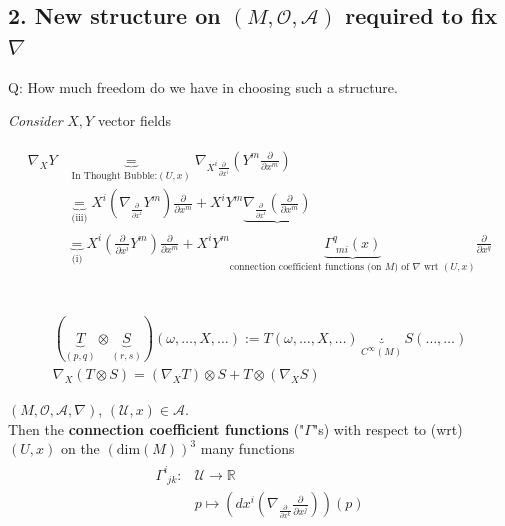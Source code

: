 			








			





	
	\subsection*{2. New structure on $(M,\mathcal{O},\mathcal{A})$ required to fix $\nabla$}

Q: How much freedom do we have in choosing such a structure.

\emph{Consider} $X,Y$ vector fields

\[
\begin{gathered}
\begin{aligned} 
\nabla_XY & \underbrace{=}_{\text{In Thought Bubble:} (U,x)  } \nabla_{X^i \frac{\partial}{\partial x^i} } \left( Y^m \frac{\partial}{ \partial x^m} \right) \\
& \underbrace{=}_{\text{(iii)}} X^i \left( \nabla_{\frac{\partial}{\partial x^i} } Y^m \right) \frac{\partial}{\partial x^m} + X^i Y^m \underbrace{ \nabla_{\frac{\partial}{\partial x^i} } \left( \frac{\partial }{ \partial x^m} \right) }_{} \\
& \underbrace{=}_{\text{(i)}} X^i \left( \frac{\partial}{\partial x^i} Y^m \right) \frac{\partial}{ \partial x^m} + X^i Y^m \underbrace{\Gamma^q_{\,\, mi}(x)}_{\text{connection coefficient functions (on $M$) of $\nabla$ wrt $(U,x)$}} \frac{\partial}{\partial x^q}
\end{aligned} 
\end{gathered}
\]	

\quad \\

\[
\begin{gathered}
(\underbrace{T}_{(p,q)}\otimes \underbrace{S}_{(r,s)})(\omega, \dots, X, \dots) := T(\omega, \dots, X, \dots) \underbrace{\cdot}_{C^{\infty}(M)} S(\dots, \dots) \\
\nabla_X (T \otimes S) = (\nabla_X T) \otimes S + T\otimes (\nabla_X S)
\end{gathered}
\]

\begin{definition} $(M, \mathcal{O}, \mathcal{A}, \nabla)$, $(\mathcal{U}, x) \in \mathcal{A}$. \\	
	Then the \textbf{connection coefficient functions} ("$\Gamma$"s) with respect to (wrt) $(U,x)$ on the $(\text{dim}(M))^3$ many functions
	\[
	\begin{gathered}
	\begin{aligned}
	\Gamma^i_{\, \, jk} : & \mathcal{U} \to \mathbb{R} \\ 
	& p \mapsto \left( dx^i \left( \nabla_{\frac{\partial}{\partial x^k} } \frac{\partial}{\partial x^j} \right)\right) (p) 
\end{aligned}	
	\end{gathered}
	\]
	
\end{definition} 

